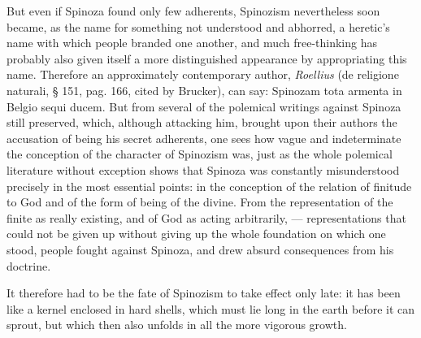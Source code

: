 \documentclass[12pt,a4paper,openany]{book}
\newcommand{\opage}[1]{\marginnote{\footnotesize\textit{[#1]}}}
\begin{document}
But even if Spinoza found only few adherents,
Spinozism nevertheless soon became, as the name for something not understood and
abhorred, a heretic's name with which people branded
one another, and much free-thinking has probably also given
itself a more distinguished appearance by appropriating this name.
Therefore an approximately contemporary author, \emph{Roellius} (de
religione naturali, § 151, pag. 166, cited by Brucker),
\opage{183} can say: Spinozam tota armenta in Belgio sequi ducem. But
from several of the polemical writings against Spinoza still preserved,
which, although attacking him, brought upon their authors the accusation
of being his secret adherents, one sees
how vague and indeterminate the conception of the character of Spinozism was,
just as the whole polemical literature
without exception shows that Spinoza was constantly misunderstood
precisely in the most essential points: in the conception of
the relation of finitude to God and of the form of being of the divine.
From the representation of the finite as
really existing, and of God as acting arbitrarily, ---
representations that could not be given up without giving up the
whole foundation on which one stood, people fought against
Spinoza, and drew absurd consequences from his doctrine.

It therefore had to be the fate of Spinozism to take effect only
late: it has been like a kernel enclosed in
hard shells, which must lie long in the earth before it can
sprout, but which then also unfolds in all the more vigorous
growth.
\end{document}
